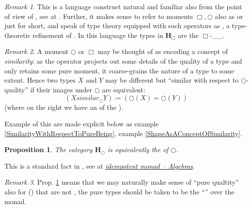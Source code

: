 \documentclass[12pt,titlepage]{article}
\theoremstyle{plain}
\newtheorem{prop}{Proposition}
\theoremstyle{definition}
\theoremstyle{remark}
\newtheorem{remark}{Remark}
\begin{document}
\begin{remark}
\label{}\hypertarget{}{}
This is a language construct natural and familiar also from the point of view of , see at .
Further, it makes sense to refer to moments $\Box,\bigcirc$ also as  or just  for short, and speak of type theory equipped with such operators as , a type-theoretic refinement of . In this language the types in $\mathbf{H}_{\Box}$ are the $\Box$-\_\_.
\end{remark}
\begin{remark}
\label{MomentsAndSimilarity}\hypertarget{MomentsAndSimilarity}{}
A moment $\bigcirc$ or $\Box$ may be thought of as encoding a concept of \emph{similarity}: as the operator projects out some details of the quality of a type and only retains some pure moment, it coarse-grains the nature of a type to some extent. Hence two types $X$ and $Y$ may be different but ``similar with respect to $\bigcirc$-quality'' if their images under $\bigcirc$ are equivalent:
\begin{displaymath}
(X similar_{\bigcirc} Y)
\coloneqq
(\bigcirc(X) =  \bigcirc(Y))
\end{displaymath}
(where on the right we have an  of the ).
\end{remark}
Example of this are made explicit below as example \ref{SimilarityWithRespectToPureBeing}, example \ref{ShapeAsAConceptOfSimilarity}.
\begin{prop}
\label{bigcircpureObjectsAreEMObjects}\hypertarget{bigcircpureObjectsAreEMObjects}{}
The category $\mathbf{H}_{\bigcirc}$ is equivalently the  of $\bigcirc$.
\end{prop}
This is a standard fact in , see at \emph{\href{idempotent+monad#AlgebrasForAnIdempotentMonad}{idempotent monad -- Algebras}}.
\begin{remark}
\label{PurityForNonIdempotent}\hypertarget{PurityForNonIdempotent}{}
Prop. \ref{bigcircpureObjectsAreEMObjects} means that we may naturally make sense of ``pure qualtity'' also for () that are not , the pure types should be taken to be the ``'' over the monad.
\end{remark}
\end{document}
